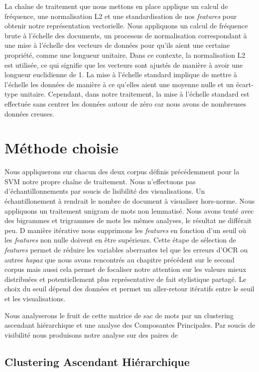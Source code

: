 La chaîne de traitement que nous mettons en place applique un calcul de fréquence, une normalisation L2 et une standardisation de nos \textit{features} pour obtenir notre représentation vectorielle.
Nous appliquons un calcul de fréquence brute à l'échelle des documents, un processus de normalisation correspondant à une mise à l'échelle des vecteurs de données pour qu'ils aient une certaine propriété, comme une longueur unitaire. Dans ce contexte, la normalisation L2 est utilisée, ce qui signifie que les vecteurs sont ajustés de manière à avoir une longueur euclidienne de 1. La mise à l'échelle standard implique de mettre à l'échelle les données de manière à ce qu'elles aient une moyenne nulle et un écart-type unitaire. Cependant, dans notre traitement, la mise à l'échelle standard est effectuée sans centrer les données autour de zéro car nous avons de nombreuses données creuses.


\section{Méthode choisie}

Nous appliquerons sur chacun des deux corpus définis précédemment pour la SVM notre propre chaîne de traitement. Nous n'effectuons pas d'échantillonnements par soucis de lisibilité des visualisations. Un échantillonement à rendrait le nombre de document à visualiser hors-norme. Nous appliquons un traitement unigram de mots non lemmatisé. Nous avons tenté avec des bigrammes et trigrammes de mots les mêmes analyses, le résultat ne différait peu. D manière itérative nous supprimons les \textit{features} en fonction d'un seuil où les \textit{features} non nulle doivent en être supérieurs. Cette étape de sélection de \textit{features} permet de réduire les variables aberrantes tel que les erreurs d'OCR ou autres \textit{hapax} que nous avons rencontrés au chapitre précédent sur le second corpus mais aussi cela permet de focaliser notre attention sur les valeurs mieux distribuées et potentiellement plus représentative de fait stylistique partagé. Le choix du seuil dépend des données et permet un aller-retour itératifs entre le seuil et les visualisations.
\par
Nous analyserons le fruit de cette matrice de sac de mots par un clustering ascendant hiérarchique et une analyse des Composantes Principales. Par soucis de visibilité nous produisons notre analyse sur des paires de 

\subsection{Clustering Ascendant Hiérarchique}

